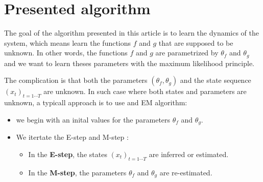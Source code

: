 \section{Presented algorithm}

The goal of the algorithm presented in this article is to learn the dynamics of the system, which means learn the functions $f$ and $g$ that are supposed to be unknown.
In other words, the functions $f$ and $g$ are parametrized by $\theta_f$ and $\theta_g$ and we want to learn theses parameters with the maximum likelihood principle.

The complication is that both the parameters $(\theta_f, \theta_g)$ and the state sequence $(x_t)_{t=1 \cdots T}$ are unknown.
In such case where both states and parameters are unknown, a typicall approach is to use and EM algorithm:
\begin{itemize}
\item we begin with an inital values for the parameters $\theta_f$ and $\theta_g$.
\item We itertate the E-step and M-step :
  \begin{itemize}
  \item In the \textbf{E-step}, the states $(x_t)_{t=1 \cdots T}$ are inferred or estimated.
  \item In the \textbf{M-step}, the parameters $\theta_f$ and $\theta_g$ are re-estimated.
  \end{itemize}
\end{itemize}
